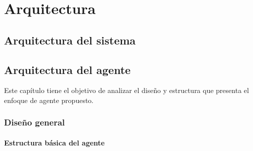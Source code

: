 
\chapter{Arquitectura}
\label{chap:Arquitectura}

\section{Arquitectura del sistema}
\label{sec:arquitectura_sistema}

\section{Arquitectura del agente}
\label{sec:arquitectura_agente}

 Este capítulo tiene el objetivo de analizar el diseño y estructura que
 presenta el enfoque de agente propuesto.


\subsection{Diseño general}
\label{sec:diseno_general}
  
  
\subsubsection{Estructura básica del agente}
\label{sec:estructura_basica_de_agente}
  
